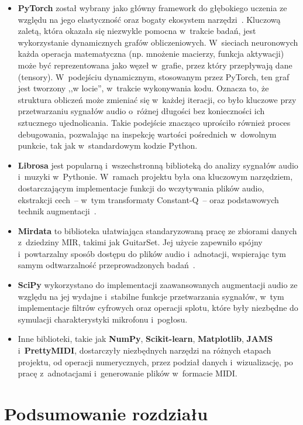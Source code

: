 \begin{itemize}
    \item \textbf{PyTorch} został wybrany jako główny framework do głębokiego uczenia ze względu na jego elastyczność oraz bogaty ekosystem narzędzi~\autocite{Paszke2019PyTorch}. Kluczową zaletą, która okazała się niezwykle pomocna w~trakcie badań, jest wykorzystanie dynamicznych grafów obliczeniowych. W~sieciach neuronowych każda operacja matematyczna (np. mnożenie macierzy, funkcja aktywacji) może być reprezentowana jako węzeł w~grafie, przez który przepływają dane (tensory). W~podejściu dynamicznym, stosowanym przez PyTorch, ten graf jest tworzony ,,w locie'', w~trakcie wykonywania kodu. Oznacza to, że struktura obliczeń może zmieniać się w~każdej iteracji, co było kluczowe przy przetwarzaniu sygnałów audio o~różnej długości bez konieczności ich sztucznego ujednolicania. Takie podejście znacząco uprościło również proces debugowania, pozwalając na inspekcję wartości pośrednich w~dowolnym punkcie, tak jak w~standardowym kodzie Python.
    \item \textbf{Librosa} jest popularną i~wszechstronną biblioteką do analizy sygnałów audio i~muzyki w~Pythonie. W~ramach projektu była ona kluczowym narzędziem, dostarczającym implementacje funkcji do wczytywania plików audio, ekstrakcji cech~– w~tym transformaty Constant-Q~– oraz podstawowych technik augmentacji~\autocite{McFee2022Librosa}.
    \item \textbf{Mirdata} to biblioteka ułatwiająca standaryzowaną pracę ze zbiorami danych z~dziedziny MIR, takimi jak GuitarSet. Jej użycie zapewniło spójny i~powtarzalny sposób dostępu do plików audio i~adnotacji, wspierając tym samym odtwarzalność przeprowadzonych badań~\autocite{Bittner2022BasicPitch}.
    \item \textbf{SciPy} wykorzystano do implementacji zaawansowanych augmentacji audio ze względu na jej wydajne i~stabilne funkcje przetwarzania sygnałów, w~tym implementacje filtrów cyfrowych oraz operacji splotu, które były niezbędne do symulacji charakterystyki mikrofonu i~pogłosu.
    \item Inne biblioteki, takie jak \textbf{NumPy}, \textbf{Scikit-learn}, \textbf{Matplotlib}, \textbf{JAMS} i~\textbf{PrettyMIDI}, dostarczyły niezbędnych narzędzi na różnych etapach projektu, od operacji numerycznych, przez podział danych i~wizualizację, po pracę z~adnotacjami i~generowanie plików w~formacie MIDI.
\end{itemize}

\section{Podsumowanie rozdziału}
\label{sec:podsumowanie_rozdzialu_3}

